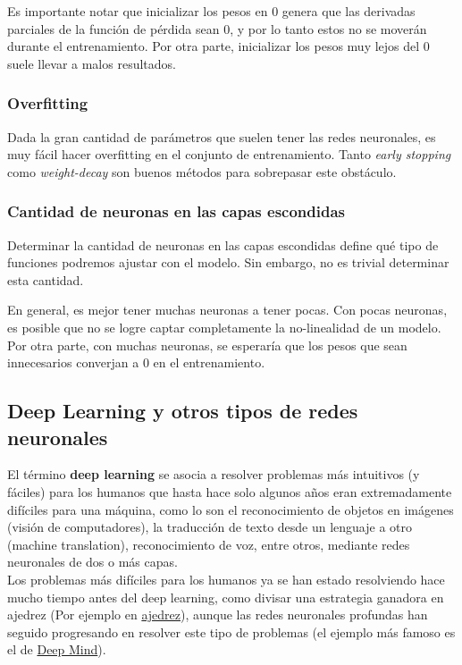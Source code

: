 Es importante notar que inicializar los pesos en $0$ genera que las derivadas parciales de la función de pérdida sean $0$, y por lo tanto estos no se moverán durante el entrenamiento. Por otra parte, inicializar los pesos muy lejos del $0$ suele llevar a malos resultados. 

\subsubsection{Overfitting}

Dada la gran cantidad de parámetros que suelen tener las redes neuronales, es muy fácil hacer overfitting en el conjunto de entrenamiento. Tanto \textit{early stopping} como \textit{weight-decay} son buenos métodos para sobrepasar este obstáculo. 

\subsubsection{Cantidad de neuronas en las capas escondidas}

Determinar la cantidad de neuronas en las capas escondidas define qué tipo de funciones podremos ajustar con el modelo. Sin embargo, no es trivial determinar esta cantidad. 

En general, es mejor tener muchas neuronas a tener pocas. Con pocas neuronas, es posible que no se logre captar completamente la no-linealidad de un modelo. Por otra parte, con muchas neuronas, se esperaría que los pesos que sean innecesarios converjan a $0$ en el entrenamiento. 


\subsection{Deep Learning y otros tipos de redes neuronales}

El t\'ermino \textbf{deep learning} se asocia a resolver problemas m\'as intuitivos (y f\'aciles) para los humanos que hasta hace solo algunos a{\~{n}}os eran extremadamente dif\'iciles para una m\'aquina, como lo son el reconocimiento de objetos en im\'agenes (visi\'on de computadores), la traducci\'on de texto desde un lenguaje a otro (machine translation), reconocimiento de voz, entre otros, mediante redes neuronales de dos o más capas.\\

Los problemas m\'as dif\'iciles para los humanos ya se han estado resolviendo hace mucho tiempo antes del deep learning, como divisar una estrategia ganadora en ajedrez (Por ejemplo en \href{https://en.wikipedia.org/wiki/Deep_Blue_versus_Garry_Kasparov}{ajedrez}), aunque las redes neuronales profundas han seguido progresando en resolver este tipo de problemas (el ejemplo más famoso es el de  \href{https://deepmind.com/research/alphago/}{Deep Mind}). \\


